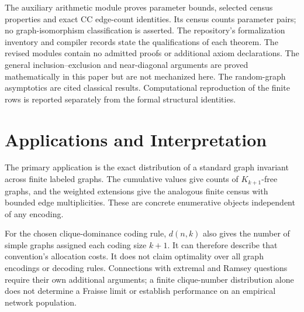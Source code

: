\documentclass[11pt,a4paper]{article}
\theoremstyle{definition}
\begin{document}
The auxiliary arithmetic module proves parameter bounds, selected
census properties and exact CC edge-count identities. Its census
counts parameter pairs; no graph-isomorphism classification is
asserted. The repository's formalization inventory and compiler
records state the qualifications of each theorem. The revised
modules contain no admitted proofs or additional axiom declarations.
The general inclusion--exclusion and near-diagonal arguments are
proved mathematically in this paper but are not mechanized here.
The random-graph asymptotics are cited classical results.
Computational reproduction of the finite rows is reported separately
from the formal structural identities.

\section{Applications and Interpretation}
The primary application is the exact distribution of a standard
graph invariant across finite labeled graphs. The cumulative values
give counts of $K_{k+1}$-free graphs, and the weighted extensions
give the analogous finite census with bounded edge multiplicities.
These are concrete enumerative objects independent of any encoding.

For the chosen clique-dominance coding rule, $d(n,k)$ also gives the
number of simple graphs assigned each coding size $k+1$. It can
therefore describe that convention's allocation costs. It does not
claim optimality over all graph encodings or decoding rules.
Connections with extremal and Ramsey questions require their own
additional arguments; a finite clique-number distribution alone
does not determine a Fraisse limit or establish performance on an
empirical network population.
\end{document}

